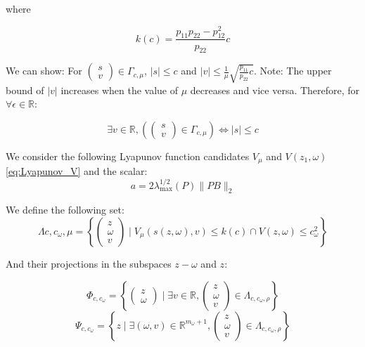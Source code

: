 where

\begin{equation}
k(c) = \frac{p_{11} p_{22} - p_{12}^2}{p_{22}} c
\end{equation}

We can show:
For \(\begin{pmatrix} s \\ v \end{pmatrix} \in \Gamma_{c, \mu}\), \(|s| \leq c\) and 
\(|v| \leq \frac{1}{\mu} \sqrt{\frac{p_{11}}{p_{22}}c}\).
Note: The upper bound of \(|v|\) increases when the value of \(\mu\) decreases and vice versa.
Therefore, for \(\forall \epsilon \in \mathbb{R}\):

\begin{equation}
    \exists v \in \mathbb{R}, \left( \begin{pmatrix} s \\ v \end{pmatrix} \in \Gamma_{c, \mu} \right) \iff |s| \leq c
\end{equation}

We consider the following Lyapunov function candidates \(V_\mu\) and \(V(z_1, \omega)\) \ref{eq:Lyapunov_V} 
and the scalar:
\begin{equation}
    a = 2 \lambda_{\max}^{1/2}(P) \|PB\|_2
\end{equation}

We define the following set:
\begin{equation}
    \Lambda{c, c_\omega, \mu} = \left\{ \begin{pmatrix} z \\ \omega \\ v \end{pmatrix} \mid V_\mu(s(z, \omega), v) \leq k(c) \cap V(z, \omega) \leq c_\omega^2 \right\}
\end{equation}

And their projections in the subspaces $z-\omega$ and $z$:

\begin{equation}
    \Phi_{c, c_\omega} = \left\{ \begin{pmatrix} z \\ \omega \end{pmatrix} \mid \exists v \in \mathbb{R}, \begin{pmatrix} z \\ \omega \\ v \end{pmatrix} \in \Lambda_{c, c_\omega, \rho} \right\}
\end{equation}
\begin{equation}
    \Psi_{c, c_\omega} = \left\{ z \mid \exists (\omega, v) \in \mathbb{R}^{m_\omega + 1}, \begin{pmatrix} z \\ \omega \\ v \end{pmatrix} \in \Lambda_{c, c_\omega, \rho} \right\}
\end{equation}

